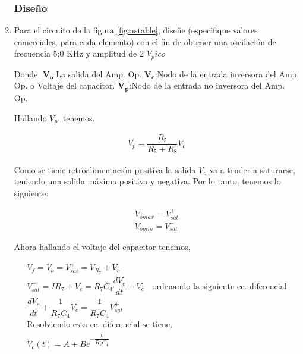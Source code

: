         \begin{enumerate}

            \subsubsection{Diseño}
            \item Para el circuito de la figura \ref{fig:astable}, diseñe (especifique valores comerciales, para cada elemento) con el fin de obtener una oscilación de frecuencia 5;0 KHz y amplitud de 2 $V_pico$

                Donde, 
                $\mathbf{V_o}$:La salida del Amp. Op.         
                $\mathbf{V_c}$:Nodo de la entrada inversora del Amp. Op. o Voltaje del capacitor.         
                $\mathbf{V_p}$:Nodo de la entrada no inversora del Amp. Op.

                Hallando $V_p$, tenemos.

                \begin{gather}
                    V_p=\dfrac{R_5}{R_5+R_8}V_o \label{eqn:vp}
                \end{gather}

                Como se tiene retroalimentación positiva la salida $V_o$ va a tender a saturarse, teniendo una salida máxima positiva y negativa. Por lo tanto, tenemos lo siguiente:

                \begin{gather}
                    V_{omax}=V_{sat}^+ \label{eqn:vomax} \\[0.5cm]
                    V_{omin}=V_{sat}^- \label{eqn:vomin}                     
                \end{gather}

                Ahora hallando el voltaje del capacitor tenemos,

                \begin{gather}
                    V_f=V_o=V_{sat}^+=V_{R_7}+V_c \label{eqn:vsat+}\\[0.5cm]
                    V_{sat}^+=IR_7+V_c=R_7C_4\dfrac{dV_c}{dt}+V_c \quad \text{ordenando la siguiente ec. diferencial} \nonumber\\[0.5cm]
                    \dfrac{dV_c}{dt}+\dfrac{1}{R_7C_4}V_c=\dfrac{1}{R_7C_4}V_{sat}^+ \nonumber\\[0.5cm]
                    \text{Resolviendo esta ec. diferencial se tiene,} \nonumber\\[0.5cm]
                    V_c(t)=A+Be^{-\dfrac{t}{R_7C_4}} \label{eqn:vct}
                \end{gather}


\end{enumerate}
